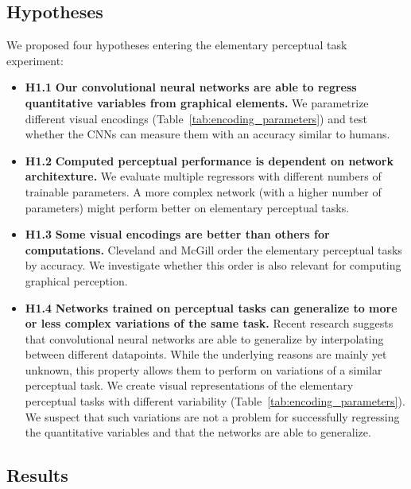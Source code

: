 %
\subsection{Hypotheses}

We proposed four hypotheses entering the elementary perceptual task experiment:

\begin{itemize}
	\item \textbf{H1.1} \textbf{Our convolutional neural networks are able to regress quantitative variables from graphical elements.} We parametrize different visual encodings (Table~\ref{tab:encoding_parameters}) and test whether the CNNs can measure them with an accuracy similar to humans.
	\item \textbf{H1.2} \textbf{Computed perceptual performance is dependent on network architexture.} We evaluate multiple regressors with different numbers of trainable parameters. A more complex network (with a higher number of parameters) might perform better on elementary perceptual tasks.
	\item \textbf{H1.3} \textbf{Some visual encodings are better than others for computations.} Cleveland and McGill order the elementary perceptual tasks by accuracy. We investigate whether this order is also relevant for computing graphical perception.
	\item \textbf{H1.4} \textbf{Networks trained on perceptual tasks can generalize to more or less complex variations of the same task.} Recent research suggests that convolutional neural networks are able to generalize by interpolating between different datapoints. While the underlying reasons are mainly yet unknown, this property allows them to perform on variations of a similar perceptual task. We create visual representations of the elementary perceptual tasks with different variability (Table~\ref{tab:encoding_parameters}). We suspect that such variations are not a problem for successfully regressing the quantitative variables and that the networks are able to generalize.
\end{itemize}

%	
%	


\subsection{Results}

